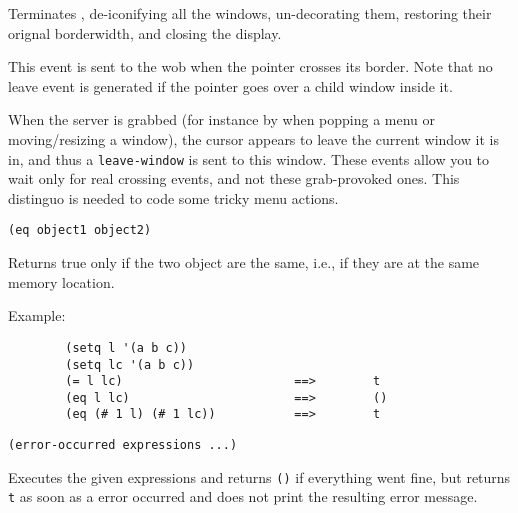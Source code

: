 Terminates {\GWM}, de-iconifying all the windows, un-decorating them,
restoring their orignal borderwidth, and closing the display.

        

This event is sent to the wob when the pointer crosses its border.
Note that no leave event is generated if the pointer goes over a child window
inside it.

        

When the server is grabbed (for instance by {\GWM} when popping a menu or
moving/resizing a window), the cursor appears to leave the current window it
is in, and thus a \verb|leave-window| is sent to this window. These events
allow you to wait only for real crossing events, and not these grab-provoked
ones. This distinguo is needed to code some tricky menu actions.


{\usagefont\begin{verbatim}
(eq object1 object2)
\end{verbatim}}\usageupspace

Returns true only if the two object are the same, i.e., if they are at the
same memory location.

Example:{\exemplefont\upspace\begin{verbatim}
        (setq l '(a b c))
        (setq lc '(a b c))
        (= l lc)                        ==>        t
        (eq l lc)                       ==>        ()
        (eq (# 1 l) (# 1 lc))           ==>        t
\end{verbatim}}


{\usagefont\begin{verbatim}
(error-occurred expressions ...)
\end{verbatim}}\usageupspace

Executes the given expressions and returns \verb"()" if everything went
fine, but returns \verb"t" as soon as a {\WOOL} error occurred and does not
print the resulting error message.

